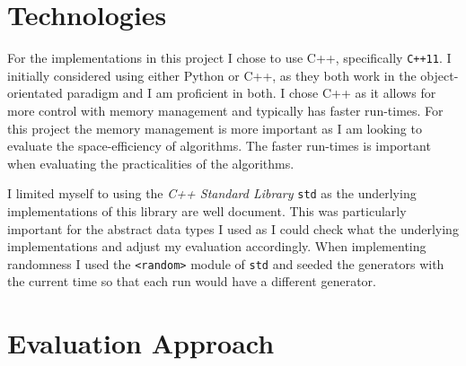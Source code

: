 \documentclass[11pt,twoside,a4paper]{report}
\begin{document}
\section{Technologies}
For the implementations in this project I chose to use C++, specifically \texttt{C++11}. I initially considered using either Python or C++, as they both work in the object-orientated paradigm and I am proficient in both. I chose C++ as it allows for more control with memory management and typically has faster run-times. For this project the memory management is more important as I am looking to evaluate the space-efficiency of algorithms. The faster run-times is important when evaluating the practicalities of the algorithms.
\par I limited myself to using the \textit{C++ Standard Library} \texttt{std} as the underlying implementations of this library are well document. This was particularly important for the abstract data types I used as I could check what the underlying implementations and adjust my evaluation accordingly. When implementing randomness I used the \texttt{<random>} module of \texttt{std} and seeded the generators with the current time so that each run would have a different generator.

\section{Evaluation Approach}

\end{document}
